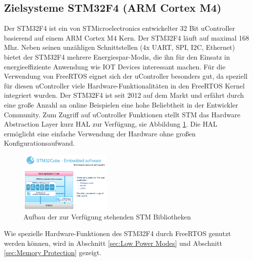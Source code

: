 \subsection{Zielsysteme STM32F4 (ARM Cortex M4)}
Der STM32F4 ist ein von STMicroelectronics entwickelter 32 Bit uController basierend auf einem ARM Cortex M4 Kern. Der STM32F4 läuft auf maximal 168 Mhz. Neben seinen unzähligen Schnittstellen (4x UART, SPI, I2C, Ethernet) bietet der STM32F4 mehrere Energiespar-Modis, die ihn für den Einsatz in energieeffiziente Anwendung wie IOT Devices interessant machen. Für die Verwendung von FreeRTOS eignet sich der uController besonders gut, da speziell für diesen uController viele Hardware-Funk\-tio\-na\-li\-tät\-en in den FreeRTOS Kernel integriert wurden. Der STM32F4 ist seit 2012 auf dem Markt und erfährt durch eine große Anzahl an online Beispielen eine hohe Beliebtheit in der Entwickler Community. Zum Zugriff auf uController Funktionen stellt STM das Hardware Abstraction Layer kurz HAL zur Verfügung, sie Abbildung \ref{fig:HAL}. Die HAL ermöglicht eine einfache Verwendung der Hardware ohne großen Konfigurationsaufwand.     
\begin{figure}[htb!]
	\centering
		\includegraphics[width=0.4\textwidth]{Pictures/STM32F4/LibraryEntry.png}
	\caption{Aufbau der zur Verfügung stehenden STM Bibliotheken }
	\label{fig:HAL}
\end{figure}
Wie spezielle Hardware-Funktionen des STM32F4 durch FreeRTOS genutzt werden können, wird in Abschnitt \ref{sec:Low Power Modes} und Abschnitt \ref{sec:Memory Protection} gezeigt.